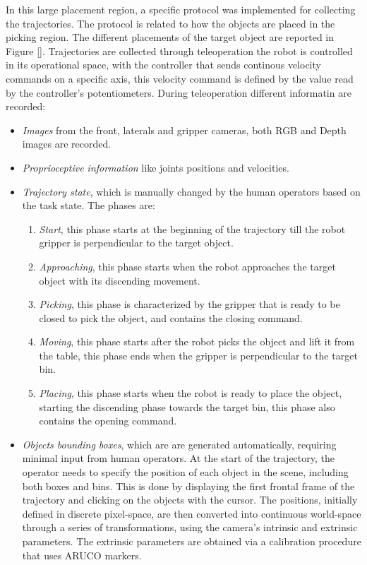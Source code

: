 In this large placement region, a specific protocol was implemented for collecting the trajectories. The protocol is related to how the objects are placed in the picking region. The different placements of the target object are reported in Figure \ref{}.
Trajectories are collected through teleoperation the robot is controlled in its operational space, with the controller that sends continous velocity commands on a specific axis, this velocity command is defined by the value read by the controller's potentiometers.
During teleoperation different informatin are recorded:
\begin{itemize}
    \item \textit{Images} from the front, laterals and gripper cameras, both RGB and Depth images are recorded.
    \item \textit{Proprioceptive information} like joints positions and velocities.
    \item \textit{Trajectory state}, which is manually changed by the human operators based on the task state. The phases are:
        \begin{enumerate}
            \item \textit{Start}, this phase starts at the beginning of the trajectory till the robot gripper is perpendicular to the target object.
            \item \textit{Approaching}, this phase starts when the robot approaches the target object with its discending movement.
            \item \textit{Picking}, this phase is characterized by the gripper that is ready to be closed to pick the object, and contains the closing command.
            \item \textit{Moving}, this phase starts after the robot picks the object and lift it from the table, this phase ends when the gripper is perpendicular to the target bin.
            \item \textit{Placing}, this phase starts when the robot is ready to place the object, starting the discending phase towards the target bin, this phase also contains the opening command.
        \end{enumerate}
    \item \textit{Objects bounding boxes}, which are are generated automatically, requiring minimal input from human operators. At the start of the trajectory, the operator needs to specify the position of each object in the scene, including both boxes and bins. This is done by displaying the first frontal frame of the trajectory and clicking on the objects with the cursor. The positions, initially defined in discrete pixel-space, are then converted into continuous world-space through a series of transformations, using the camera's intrinsic and extrinsic parameters. The extrinsic parameters are obtained via a calibration procedure that uses ARUCO markers.
\end{itemize}
